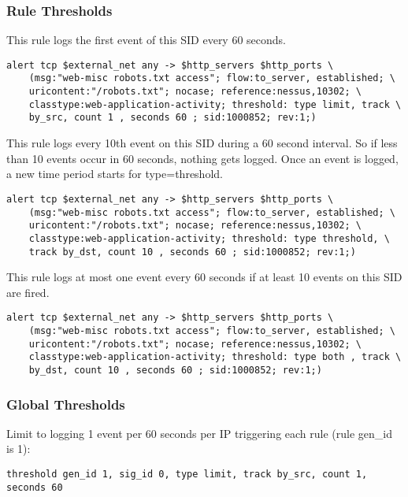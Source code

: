 \documentclass[english]{report}
\begin{document}
\subsubsection{Rule Thresholds}

This rule logs the first event of this SID every 60 seconds.

\begin{verbatim}
alert tcp $external_net any -> $http_servers $http_ports \
    (msg:"web-misc robots.txt access"; flow:to_server, established; \
    uricontent:"/robots.txt"; nocase; reference:nessus,10302; \
    classtype:web-application-activity; threshold: type limit, track \
    by_src, count 1 , seconds 60 ; sid:1000852; rev:1;)
\end{verbatim}
                 

This rule logs every 10th event on this SID during a 60 second interval. So if
less than 10 events occur in 60 seconds, nothing gets logged.  Once an event is
logged, a new time period starts for type=threshold.

\begin{verbatim}
alert tcp $external_net any -> $http_servers $http_ports \
    (msg:"web-misc robots.txt access"; flow:to_server, established; \
    uricontent:"/robots.txt"; nocase; reference:nessus,10302; \
    classtype:web-application-activity; threshold: type threshold, \
    track by_dst, count 10 , seconds 60 ; sid:1000852; rev:1;)
\end{verbatim}


This rule logs at most one event every 60 seconds if at least 10 events on this SID are fired.

\begin{verbatim}
alert tcp $external_net any -> $http_servers $http_ports \
    (msg:"web-misc robots.txt access"; flow:to_server, established; \
    uricontent:"/robots.txt"; nocase; reference:nessus,10302; \
    classtype:web-application-activity; threshold: type both , track \
    by_dst, count 10 , seconds 60 ; sid:1000852; rev:1;)
\end{verbatim}

\subsubsection{Global Thresholds}

Limit to logging 1 event per 60 seconds per IP triggering each rule (rule gen\_id is 1):
\begin{verbatim}
threshold gen_id 1, sig_id 0, type limit, track by_src, count 1, seconds 60
\end{verbatim}
\end{document}

